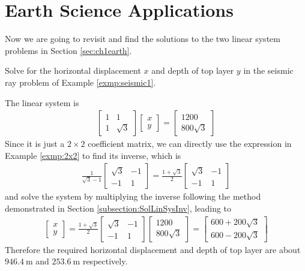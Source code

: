 \section{Earth Science Applications}
\label{sec:ch3earth}
Now we are going to revisit and find the solutions to the two linear system problems in Section \ref{sec:ch1earth}.
\begin{exmp}
Solve for the horizontal displacement $x$ and depth of top layer $y$ in the seismic ray problem of Example \ref{exmp:seismic1}.
\end{exmp}
\begin{solution}
The linear system is
\begin{align*}
\begin{bmatrix}
1 & 1 \\
1 & \sqrt{3}
\end{bmatrix}
\begin{bmatrix}
x \\
y
\end{bmatrix}
=
\begin{bmatrix}
1200 \\
800\sqrt{3}
\end{bmatrix}
\end{align*}
Since it is just a $2 \times 2$ coefficient matrix, we can directly use the expression in Example \ref{exmp:2x2} to find its inverse, which is
\begin{align*}
\frac{1}{\sqrt{3}-1}
\begin{bmatrix}
\sqrt{3} & -1 \\
-1 & 1
\end{bmatrix}
=
\frac{1+\sqrt{3}}{2}
\begin{bmatrix}
\sqrt{3} & -1 \\
-1 & 1
\end{bmatrix}
\end{align*}
and solve the system by multiplying the inverse following the method demonstrated in Section \ref{subsection:SolLinSysInv}, leading to
\begin{align*}
\begin{bmatrix}
x \\
y
\end{bmatrix}
=
\frac{1+\sqrt{3}}{2}
\begin{bmatrix}
\sqrt{3} & -1 \\
-1 & 1
\end{bmatrix}
\begin{bmatrix}
1200 \\
800\sqrt{3}
\end{bmatrix}
=
\begin{bmatrix}
600+200\sqrt{3}\\
600-200\sqrt{3}
\end{bmatrix}
\end{align*}
Therefore the required horizontal displacement and depth of top layer are about $\SI{946.4}{\m}$ and $\SI{253.6}{\m}$ respectively.
\end{solution}

